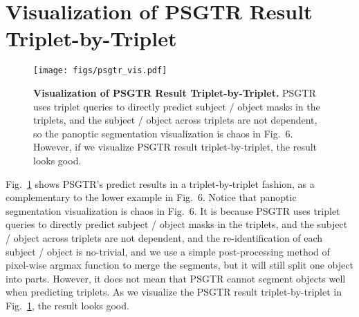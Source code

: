 \documentclass[runningheads]{llncs}
\begin{document}
\section{Visualization of PSGTR Result Triplet-by-Triplet}
\begin{figure}[!t]
    \centering
    \texttt{[image: figs/psgtr\_vis.pdf]}
    \caption{\textbf{Visualization of PSGTR Result Triplet-by-Triplet.} 
    PSGTR uses triplet queries to directly predict subject / object masks in the triplets, and the subject / object across triplets are not dependent, so the panoptic segmentation visualization is chaos in Fig.~\textcolor{linkcolor}{6}.
    However, if we visualize PSGTR result triplet-by-triplet, the result looks good.
    }
    \label{fig:psgtr_vis}
\end{figure}
Fig.~\ref{fig:psgtr_vis} shows PSGTR's predict results in a triplet-by-triplet fashion, as a complementary to the lower example in Fig.~\textcolor{linkcolor}{6}.
Notice that panoptic segmentation visualization is chaos in Fig.~\textcolor{linkcolor}{6}.
It is because PSGTR uses triplet queries to directly predict subject / object masks in the triplets, and the subject / object across triplets are not dependent, and the re-identification of each subject / object is no-trivial, and we use a simple post-processing method of pixel-wise argmax function to merge the segments, but it will still split one object into parts. However, it does not mean that PSGTR cannot segment objects well when predicting triplets. As we visualize the PSGTR result triplet-by-triplet in Fig.~\ref{fig:psgtr_vis}, the result looks good.


 
\end{document}
